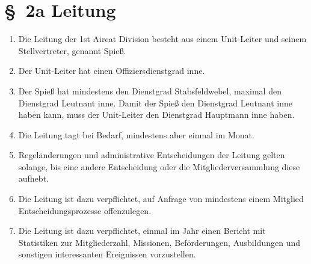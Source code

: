 \section*{\S~2a Leitung}
\label{sec:leitung}

\begin{enumerate}[label=(\arabic*)]
    \item Die Leitung der 1st Aircat Division besteht aus einem Unit-Leiter und seinem Stellvertreter, genannt Spieß.
    \item Der Unit-Leiter hat einen Offiziersdienstgrad inne.
    \item Der Spieß hat mindestens den Dienstgrad Stabsfeldwebel, maximal den Dienstgrad Leutnant inne. Damit der Spieß den Dienstgrad Leutnant inne haben kann, muss der Unit-Leiter den Dienstgrad Hauptmann inne haben.
    \item Die Leitung tagt bei Bedarf, mindestens aber einmal im Monat.
    \item Regeländerungen und administrative Entscheidungen der Leitung gelten solange, bis eine andere Entscheidung oder die Mitgliederversammlung diese aufhebt.
    \item Die Leitung ist dazu verpflichtet, auf Anfrage von mindestens einem Mitglied Entscheidungsprozesse offenzulegen.
    \item Die Leitung ist dazu verpflichtet, einmal im Jahr einen Bericht mit Statistiken zur Mitgliederzahl, Missionen, Beförderungen, Ausbildungen und sonstigen interessanten Ereignissen vorzustellen.
\end{enumerate}